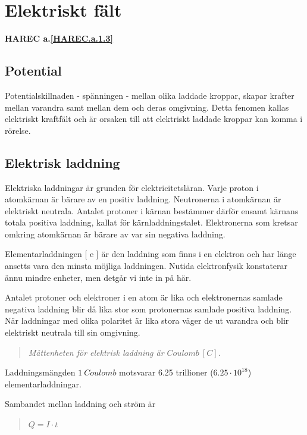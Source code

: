\section{Elektriskt fält}
\textbf{HAREC a.\ref{HAREC.a.1.3}\label{myHAREC.a.1.3}}
\label{elektriskafält}

\subsection{Potential}

Potentialskillnaden - spänningen - mellan olika laddade kroppar, skapar krafter
mellan varandra samt mellan dem och deras omgivning. Detta fenomen kallas
elektriskt kraftfält och är orsaken till att elektriskt laddade kroppar kan
komma i rörelse.

\subsection{Elektrisk laddning}

Elektriska laddningar är grunden för elektricitetsläran. Varje proton i
atomkärnan är bärare av en positiv laddning. Neutronerna i atomkärnan är
elektriskt neutrala. Antalet protoner i kärnan bestämmer därför ensamt kärnans
totala positiva laddning, kallat för kärnladdningstalet. Elektronerna som
kretsar omkring atomkärnan är bärare av var sin negativa laddning.

Elementarladdningen [ e ] är den laddning som finns i en elektron och har länge
ansetts vara den minsta möjliga laddningen. Nutida elektronfysik konstaterar
ännu mindre enheter, men detgår vi inte in på här.

Antalet protoner och elektroner i en atom är lika och elektronernas samlade
negativa laddning blir då lika stor som protonernas samlade positiva laddning.
När laddningar med olika polaritet är lika stora väger de ut varandra och blir
elektriskt neutrala till sin omgivning.

\begin{quote}\emph{
Måttenheten för elektrisk laddning är \(Coulomb\ [C]\).
}\end{quote}

Laddningsmängden \(1\ Coulomb\) motsvarar 6.25 trillioner (\(6.25\cdot10^{18}\))
elementarladdningar.

Sambandet mellan laddning och ström är

\begin{quote}
\(Q = I \cdot t\)
\end{quote}

